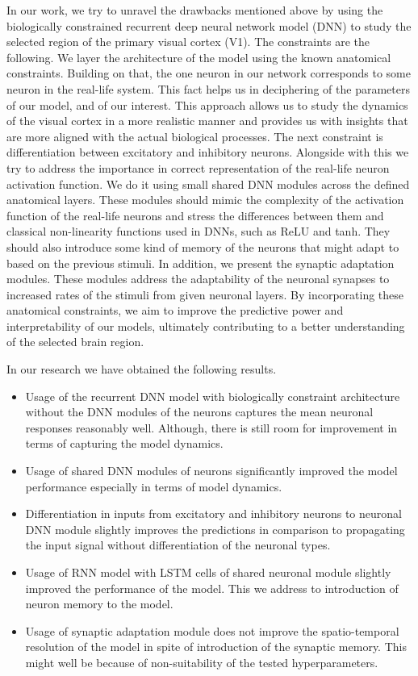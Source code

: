 In our work, we try to unravel the drawbacks mentioned above by using 
the biologically constrained recurrent deep neural network model (DNN) to
study the selected region of the primary visual cortex (V1).
The constraints are the following. We layer the architecture of the
model using the known anatomical constraints. Building on that, the one 
neuron in our network corresponds to some neuron in the real-life system. 
This fact helps us in deciphering of the parameters of our model, and
of our interest. This approach allows us to study the dynamics of the 
visual cortex in a more realistic manner and provides us with 
insights that are more aligned with the actual biological processes.
The next constraint is differentiation between excitatory and inhibitory
neurons. Alongside with this we try to address the importance in correct
representation of the real-life neuron activation function. We do it 
using small shared DNN modules across the defined anatomical layers. 
These modules should mimic the complexity of the activation function 
of the real-life neurons and stress the differences between them and 
classical non-linearity functions used in DNNs, such as ReLU and tanh.
They should also introduce some kind of memory of the neurons that might
adapt to based on the previous stimuli. In addition, we present the 
synaptic adaptation modules. These modules address the adaptability of the
neuronal synapses to increased rates of the stimuli from given neuronal
layers. By incorporating these anatomical constraints, we aim to improve 
the predictive power and interpretability of our models, ultimately 
contributing to a better understanding of the selected brain region.

In our research we have obtained the following results. 
\begin{itemize}
    \item Usage of the recurrent DNN model with biologically constraint 
    architecture without the DNN modules of the neurons captures the 
    mean neuronal responses reasonably well. Although, there is still
    room for improvement in terms of capturing the model dynamics.
    \item Usage of shared DNN modules of neurons significantly improved the
    model performance especially in terms of model dynamics.
    \item Differentiation in inputs from excitatory and inhibitory
    neurons to neuronal DNN module slightly improves the predictions in
    comparison to propagating the input signal without differentiation
    of the neuronal types.
    \item Usage of RNN model with LSTM cells of shared neuronal module
    slightly improved the performance of the model. This we address to
    introduction of neuron memory to the model.
    \item Usage of synaptic adaptation module does not improve the
    spatio-temporal resolution of the model in spite of introduction of 
    the synaptic memory. This might well be because of non-suitability of
    the tested hyperparameters.
\end{itemize}

